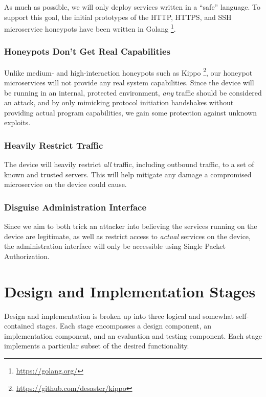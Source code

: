 As much as possible, we will only deploy services written in a ``safe''
language. To support this goal, the initial prototypes of the HTTP, HTTPS,
and SSH microservice honeypots have been written in Golang
\footnote{\url{https://golang.org/}}.

\subsubsection{Honeypots Don't Get Real Capabilities}

Unlike medium- and high-interaction honeypots such as Kippo
\footnote{\url{https://github.com/desaster/kippo}}, our honeypot microservices
will not provide any real system capabilities. Since the device will be
running in an internal, protected environment, \textit{any} traffic should
be considered an attack, and by only mimicking protocol initiation handshakes
without providing actual program capabilities, we gain some protection
against unknown exploits.

\subsubsection{Heavily Restrict Traffic}

The device will heavily restrict \textit{all} traffic, including outbound
traffic, to a set of known and trusted servers. This will help mitigate any
damage a compromised microservice on the device could cause.

\subsubsection{Disguise Administration Interface}

Since we aim to both trick an attacker into believing the services running
on the device are legitimate, as well as restrict access to \textit{actual}
services on the device, the administration interface will only be
accessible using Single Packet Authorization.

\section{Design and Implementation Stages}

Design and implementation is broken up into three logical and somewhat
self-contained stages. Each stage encompasses a design component, an
implementation component, and an evaluation and testing component. Each stage
implements a particular subset of the desired functionality.

